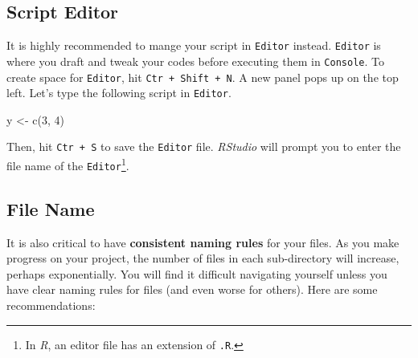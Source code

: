 \documentclass[
]{book}
\newenvironment{Shaded}{\begin{snugshade}}{\end{snugshade}}
\newcommand{\DecValTok}[1]{\textcolor[rgb]{0.00,0.00,0.81}{#1}}
\newcommand{\FunctionTok}[1]{\textcolor[rgb]{0.00,0.00,0.00}{#1}}
\newcommand{\NormalTok}[1]{#1}
\newcommand{\OtherTok}[1]{\textcolor[rgb]{0.56,0.35,0.01}{#1}}
\begin{document}
\hypertarget{script-editor}{%
\subsection{Script Editor}\label{script-editor}}

It is highly recommended to mange your script in \texttt{Editor} instead. \texttt{Editor} is where you draft and tweak your codes before executing them in \texttt{Console}. To create space for \texttt{Editor}, hit \texttt{Ctr\ +\ Shift\ +\ N}. A new panel pops up on the top left. Let's type the following script in \texttt{Editor}.

\begin{Shaded}
\begin{Highlighting}[]
\NormalTok{y }\OtherTok{\textless{}{-}} \FunctionTok{c}\NormalTok{(}\DecValTok{3}\NormalTok{, }\DecValTok{4}\NormalTok{)}
\end{Highlighting}
\end{Shaded}

Then, hit \texttt{Ctr\ +\ S} to save the \texttt{Editor} file. \emph{RStudio} will prompt you to enter the file name of the \texttt{Editor}\footnote{In \emph{R}, an editor file has an extension of \texttt{.R}.}.

\hypertarget{file-name}{%
\subsection{File Name}\label{file-name}}

It is also critical to have \textbf{consistent naming rules} for your files. As you make progress on your project, the number of files in each sub-directory will increase, perhaps exponentially. You will find it difficult navigating yourself unless you have clear naming rules for files (and even worse for others). Here are some recommendations:
\end{document}
